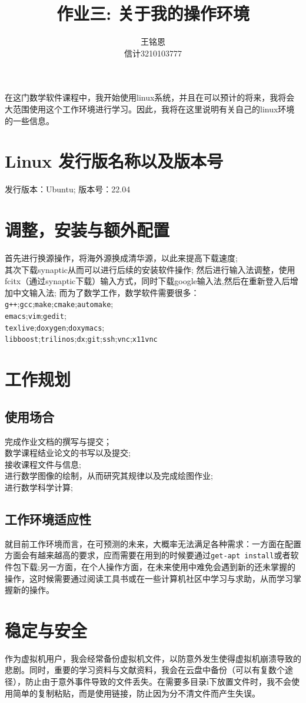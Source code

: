 \documentclass{ctexart}
\title{作业三: 关于我的操作环境}
\author{王铭恩\\信计3210103777}
\begin{document}
\maketitle

在这门数学软件课程中，我开始使用linux系统，并且在可以预计的将来，我将会大范围使用这个工作环境进行学习。因此，我将在这里说明有关自己的linux环境的一些信息。\cite{mathsoft}
\section{Linux 发行版名称以及版本号}
发行版本：Ubuntu\cite{linux};
    版本号：22.04
\section{调整，安装与额外配置}
首先进行换源操作，将海外源换成清华源，以此来提高下载速度;\\
    其次下载synaptic从而可以进行后续的安装软件操作;
    然后进行输入法调整，使用fcitx（通过synaptic下载）输入方式，同时下载google输入法,然后在重新登入后增加中文输入法;
    而为了数学工作，数学软件需要很多：\\
\verb|g++|;\verb|gcc|;\verb|make|;\verb|cmake|;\verb|automake|;\\
\verb|emacs|;\verb|vim|;\verb|gedit|;\\
\verb|texlive|;\verb|doxygen|;\verb|doxymacs|;\\
\verb|libboost|;\verb|trilinos|;\verb|dx|;\verb|git|;\verb|ssh|;\verb|vnc|;\verb|x11vnc|

\section{工作规划}
\subsection{使用场合}
完成作业文档的撰写与提交；\\
    数学课程结业论文的书写以及提交;\\
    接收课程文件与信息;\\
    进行数学图像的绘制，从而研究其规律以及完成绘图作业;\\
    进行数学科学计算;\\
\subsection{工作环境适应性}
就目前工作环境而言，在可预测的未来，大概率无法满足各种需求：一方面在配置方面会有越来越高的要求，应而需要在用到的时候要通过\verb|get-apt install|或者软件包下载;另一方面，在个人操作方面，在未来使用中难免会遇到新的还未掌握的操作，这时候需要通过阅读工具书或在一些计算机社区中学习与求助，从而学习掌握新的操作。


\section{稳定与安全}
作为虚拟机用户，我会经常备份虚拟机文件，以防意外发生使得虚拟机崩溃导致的悲剧。同时，重要的学习资料与文献资料，我会在云盘中备份（可以有复数个途径），防止由于意外事件导致的文件丢失。在需要多目录i下放置文件时，我不会使用简单的复制粘贴，而是使用链接，防止因为分不清文件而产生失误。


\end{document}
